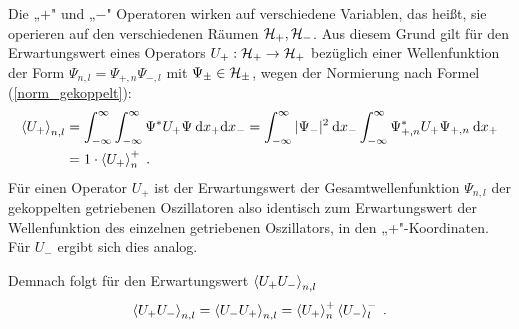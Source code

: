   Die „$+$" und „$-$" Operatoren wirken auf verschiedene Variablen, das heißt, sie operieren auf den verschiedenen Räumen $\cal H_+,\cal H_-$.
  Aus diesem Grund gilt für den Erwartungswert eines Operators $U_+:\cal H_+ \rightarrow \cal H_+$ bezüglich einer Wellenfunktion der Form $\Psi_{n,l}=\Psi_{+,n}\Psi_{-,l}$ mit $\Psi_\pm \in \cal H_\pm$, wegen der Normierung nach Formel (\ref{norm_gekoppelt}):
  \begin{align}
    \braket{U_+}_{n,l} &= \int_{-\infty}^{\infty}\int_{-\infty}^{\infty} \Psi^*U_+\Psi \: \text dx_+ \text dx_-
    = \int_{-\infty}^{\infty} |\Psi_-|^2 \: \text dx_- \int_{-\infty}^{\infty} \Psi_{+,n}^*U_+\Psi_{+,n} \: \text dx_+ \notag\\
    &= 1 \cdot \braket{U_+}_n^+ \; .
    \label{erwartungswert_gekoppelt}
  \end{align}
  Für einen Operator $U_+$ ist der Erwartungswert der Gesamtwellenfunktion $\Psi_{n,l}$ der gekoppelten getriebenen Oszillatoren also identisch zum Erwartungswert der Wellenfunktion des einzelnen getriebenen Oszillators, in den „+"-Koordinaten.
  Für $U_-$ ergibt sich dies analog.

  Demnach folgt für den Erwartungswert $\braket{U_+U_-}_{n,l}$
  \begin{equation}
    \braket{U_+U_-}_{n,l}=\braket{U_-U_+}_{n,l} = \braket{U_+}_n^+\braket{U_-}_l^- \; .
    \label{erwartungswert_gekoppelt_produkt}
  \end{equation}
\iffalse
  \textbf{Graphische Darstellung}\\
  F"ur die graphische Darstellung der Erwartungswerte werden dimensionslose Gr"o"sen eingef"uhrt, indem $E_0=\hbar  \omega_0/2$ als charachteristische Energie des Systems betrachtet wird:

  \begin{align}
    &\frac{H(t)}{E_0}\frac{H'(t)}=\frac{p^2}{p_0}+\frac{x^2}{x_0}-\frac{A}{A_0}\sin(\omega t)\frac{x}{x_0}
    =p'+x'-A'\sin(\omega t)x' \;, %
    \text{mit}\;p_0=m\omega s \;,\;x_0=s\;,\;A_0=\frac{\hbar \omega_0}{s} \notag\\
    &\text{d.\,h.}\;
  \end{align}
  wobei $s$ wieder die charakteristische L"ange nach (\ref{charak_laenge}) ist.
\fi

